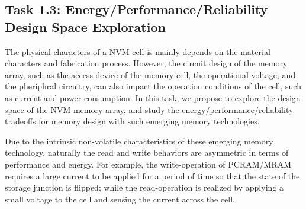 \subsection{Task 1.3: Energy/Performance/Reliability Design Space Exploration}

The physical characters of a NVM cell is mainly depends
on the material characters and fabrication process. However, the circuit design
of the memory array, such as the access device of the memory cell, the operational
voltage, and the pheriphral circuitry, can also impact the operation
conditions of the cell, such as current and power consumption. In this task, we propose to explore the design space of the NVM memory array, and study the energy/performance/reliability tradeoffs for memory design with such emerging
memory technologies.  

Due to the intrinsic non-volatile characteristics of these emerging memory technology, naturally the read and write behaviors are asymmetric in terms of performance and energy. For example, the write-operation of PCRAM/MRAM requires a large current to be applied for a period of time so that the state of the storage junction is flipped; while the read-operation is realized by applying a small voltage to the cell and sensing the current across the cell.


